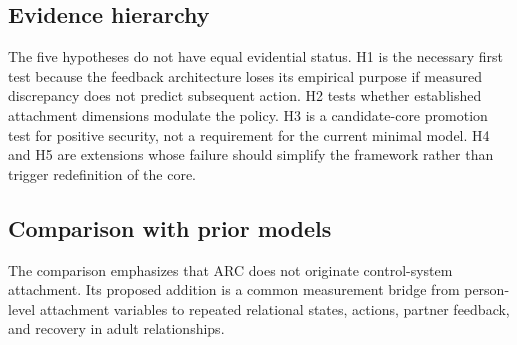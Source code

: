 \subsection{Evidence hierarchy}

The five hypotheses do not have equal evidential status. H1 is the necessary first test because the feedback architecture loses its empirical purpose if measured discrepancy does not predict subsequent action. H2 tests whether established attachment dimensions modulate the policy. H3 is a candidate-core promotion test for positive security, not a requirement for the current minimal model. H4 and H5 are extensions whose failure should simplify the framework rather than trigger redefinition of the core.



\subsection{Comparison with prior models}



The comparison emphasizes that ARC does not originate control-system attachment. Its proposed addition is a common measurement bridge from person-level attachment variables to repeated relational states, actions, partner feedback, and recovery in adult relationships.
